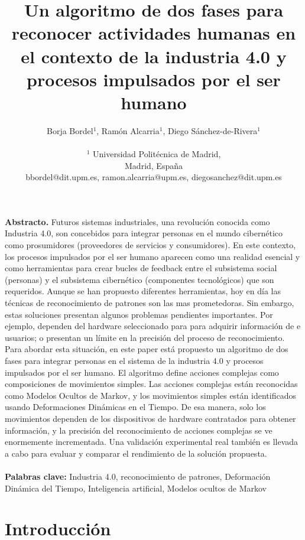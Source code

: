\documentclass[10pt]{article}
\title{\textbf{Un algoritmo de dos fases para reconocer actividades humanas en el contexto de la industria 4.0 y procesos impulsados por el ser humano}}
\author{Borja Bordel$^1$, Ramón Alcarria$^1$, Diego Sánchez-de-Rivera$^1$ \\
\\
$^1$ Universidad Politécnica de Madrid,\\
Madrid, España\\
bbordel@dit.upm.es, ramon.alcarria@upm.es, diegosanchez@dit.upm.es}
\date{}
\begin{document}
\pagestyle{empty}

\maketitle

\thispagestyle{empty}

\subsection*{}
\textbf{Abstracto.} Futuros sistemas industriales, una revolución conocida como Industria 4.0, son concebidos para integrar personas en el mundo cibernético como prosumidores (proveedores de servicios y consumidores). En este contexto, los procesos impulsados por el ser humano aparecen como una realidad esencial y como herramientas para crear bucles de feedback entre el subsistema social (personas) y el subsistema cibernético (componentes tecnológicos) que son requeridos. Aunque se han propuesto diferentes herramientas, hoy en día las técnicas de reconocimiento de patrones son las mas prometedoras. Sin embargo, estas soluciones presentan algunos problemas pendientes importantes. Por ejemplo, dependen del hardware seleccionado para para adquirir información de e usuarios; o presentan un límite en la precisión del proceso de reconocimiento. Para abordar esta situación, en este paper está propuesto un algoritmo de dos fases para integrar personas en el sistema de la industria 4.0 y procesos impulsados por el ser humano. El algoritmo define acciones complejas como composiciones de movimientos simples. Las acciones complejas están reconocidas como Modelos Ocultos de Markov, y los movimientos simples están identificados usando Deformaciones Dinámicas en el Tiempo. De esa manera, solo los movimientos dependen de los dispositivos de hardware contratados para obtener información, y la precisión del reconocimiento de acciones complejas se ve enormemente incrementada. Una validación experimental real también es llevada a cabo para evaluar y comparar el rendimiento de la solución propuesta. \\
\\
\textbf{Palabras clave:} Industria 4.0, reconocimiento de patrones, Deformación Dinámica del Tiempo, Inteligencia artificial, Modelos ocultos de Markov

\section{Introducción}
\end{document}
